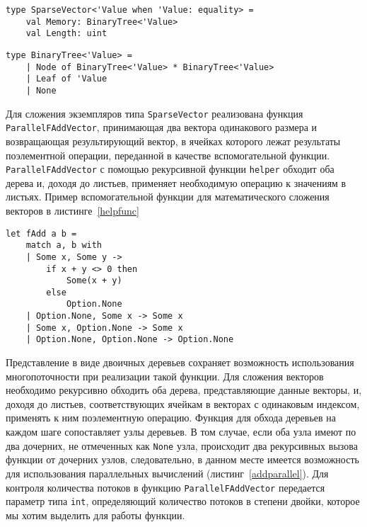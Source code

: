 \begin{lstlisting}[style=codelistingstyle, caption={Тип SparseVector},label={sparsevector}, frame=single]
type SparseVector<'Value when 'Value: equality> =
    val Memory: BinaryTree<'Value>
    val Length: uint
\end{lstlisting}

\begin{lstlisting}[style=codelistingstyle, caption={Тип BinaryTree},label={binarytree}, frame=single]
type BinaryTree<'Value> =
    | Node of BinaryTree<'Value> * BinaryTree<'Value>
    | Leaf of 'Value
    | None
\end{lstlisting}

Для сложения экземпляров типа \texttt{SparseVector} реализована функция \texttt{ParallelFAddVector}, принимающая два вектора одинакового размера и возвращающая результирующий вектор, в ячейках которого лежат результаты поэлементной операции, переданной в качестве вспомогательной функции. \texttt{ParallelFAddVector} с помощью рекурсивной функции \texttt{helper} обходит оба дерева и, доходя до листьев, применяет необходимую операцию к значениям в листьях. Пример вспомогательной функции для математического сложения векторов в листинге~\ref{helpfunc} 

\begin{lstlisting}[style=codelistingstyle, caption={Пример вспомогательной поэлементной функции},label={helpfunc}, frame=single]
let fAdd a b =
    match a, b with
    | Some x, Some y ->
        if x + y <> 0 then
            Some(x + y)
        else
            Option.None
    | Option.None, Some x -> Some x
    | Some x, Option.None -> Some x
    | Option.None, Option.None -> Option.None
\end{lstlisting}

Представление в виде двоичных деревьев сохраняет возможность использования многопоточности при реализации такой функции. Для сложения векторов необходимо рекурсивно обходить оба дерева, представляющие данные векторы, и, доходя до листьев, соответствующих ячейкам в векторах с одинаковым индексом, применять к ним поэлементную операцию. Функция для обхода деревьев на каждом шаге сопоставляет узлы деревьев. В том случае, если оба узла имеют по два дочерних, не отмеченных как \texttt{None} узла, происходит два рекурсивных вызова функции от дочерних узлов, следовательно, в данном месте имеется возможность для использования параллельных вычислений (листинг~\ref{addparallel}). Для контроля количества потоков в функцию \texttt{ParallelFAddVector} передается параметр типа \texttt{int}, определяющий количество потоков в степени двойки, которое мы хотим выделить для работы функции.


